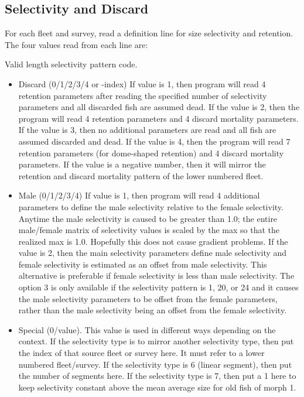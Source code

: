 \subsection{Selectivity and Discard}
For each fleet and survey, read a definition line for size selectivity and retention.  The four values read from each line are:

Valid length selectivity pattern code.

\begin{itemize}
	\item Discard \hypertarget{DomeRetention}{(0/1/2/3/4 or -index)} If value is 1, then program will read 4 retention parameters after reading the specified number of selectivity parameters and all discarded fish are assumed dead.  If the value is 2, then the program will read 4 retention parameters and 4 discard mortality parameters.  If the value is 3, then no additional parameters are read and all fish are assumed discarded and dead. If the value is 4, then the program will read 7 retention parameters (for dome-shaped retention) and 4 discard mortality parameters.  If the value is a negative number, then it will mirror the retention and discard mortality pattern of the lower numbered fleet.

	\item Male (0/1/2/3/4)  If value is 1, then program will read 4 additional parameters to define the male selectivity relative to the female selectivity.  Anytime the male selectivity is caused to be greater than 1.0; the entire male/female matrix of selectivity values is scaled by the max so that the realized max is 1.0.  Hopefully this does not cause gradient problems.  If the value is 2, then the main selectivity parameters define male selectivity and female selectivity is estimated as an offset from male selectivity.  This alternative is preferable if female selectivity is less than male selectivity.  The option 3 is only available if the selectivity pattern is 1, 20, or 24 and it causes the male selectivity parameters to be offset from the female parameters, rather than the male selectivity being an offset from the female selectivity.

	\item Special (0/value).  This value is used in different ways depending on the context.  If the selectivity type is to mirror another selectivity type, then put the index of that source fleet or survey here.  It must refer to a lower numbered fleet/survey.  If the selectivity type is 6 (linear segment), then put the number of segments here.  If the selectivity type is 7, then put a 1 here to keep selectivity constant above the mean average size for old fish of morph 1.
\end{itemize}

